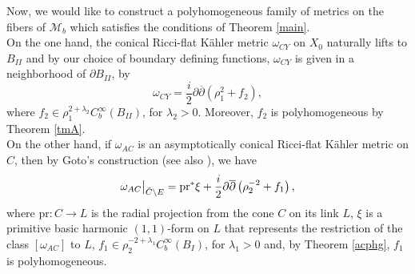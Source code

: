 \documentclass[a4paper,11pt]{article}
\newcommand\restr[2]{{%
  \left.\kern-\nulldelimiterspace %
  #1 %
  \littletaller %
  \right|_{#2} %
  }}
\newcommand{\littletaller}{\mathchoice{\vphantom{\big|}}{}{}{}}
\begin{document}
Now, we would like to construct a polyhomogeneous family of metrics on the fibers of $\mathcal{M}_b$ which satisfies the conditions of Theorem \ref{main}.\\

On the one hand, the conical Ricci-flat Kähler metric $\omega_{CY}$ on $X_0$ naturally lifts to $B_{II}$ and by our choice of boundary defining functions, $\omega_{CY}$ is given in a neighborhood of $\partial B_{II}$, by 
$$
\omega_{CY} = \frac{i}{2} \partial \overline{\partial} \left( \rho_1^2 + f_2 \right),
$$
where $f_2 \in \rho_1^{2+ \lambda_2} C_b^\infty(B_{II})$, for $\lambda_2>0$. Moreover, $f_2$ is polyhomogeneous by Theorem \ref{tmA}.\\

On the other hand, if $\omega_{AC}$ is an asymptotically conical Ricci-flat Kähler metric on $\hat C$, then by Goto's construction \cite[Theorem 5.1, Lemma 5.6, Lemma 5.7]{goto_calabi-yau_2012} (see also \cite[Section 4.2]{conlon2013asymptotically}), we have 
$$
\restr{\omega_{AC}}{\hat C \setminus E} = \mathrm{pr}^{*} \xi + \frac{i}{2} \partial \overline{\partial} \left( \rho_2^{-2} + f_1 \right),
$$
where $\mathrm{pr} : C \rightarrow L$ is the radial projection from the cone $C$ on its link $L$, $\xi$ is a primitive basic harmonic $(1,1)$-form on $L$ that represents the restriction of the class $[\omega_{AC}]$ to $L$, $f_1 \in \rho_2^{-2+ \lambda_1} C_b^\infty(B_{I})$, for $\lambda_1>0$ and, by Theorem \ref{acphg}, $f_1$ is polyhomogeneous.\\
\end{document}
